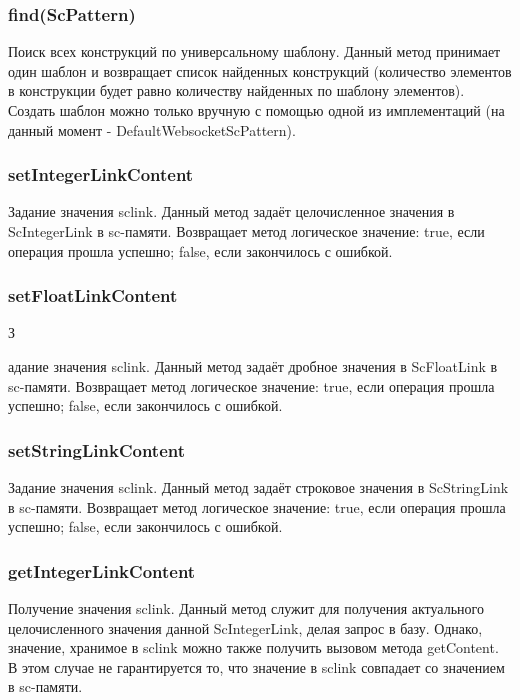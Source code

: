 \subsubsection{find(ScPattern)} 

Поиск всех конструкций по универсальному шаблону. Данный метод принимает один шаблон и возвращает список найденных конструкций (количество элементов в конструкции будет равно количеству найденных по шаблону элементов). Создать шаблон можно только вручную с помощью одной из имплементаций (на данный момент - DefaultWebsocketScPattern).

\subsubsection {setIntegerLinkContent} 

Задание значения sclink. Данный метод задаёт целочисленное значения в ScIntegerLink в sc-памяти. Возвращает метод логическое значение: true, если операция прошла успешно; false, если закончилось с ошибкой. 

\subsubsection {setFloatLinkContent} З

адание значения sclink. Данный метод задаёт дробное значения в ScFloatLink в sc-памяти. Возвращает метод логическое значение: true, если операция прошла успешно; false, если закончилось с ошибкой. 

\subsubsection {setStringLinkContent} 

Задание значения sclink. Данный метод задаёт строковое значения в ScStringLink в sc-памяти. Возвращает метод логическое значение: true, если операция прошла успешно; false, если закончилось с ошибкой. 

\subsubsection {getIntegerLinkContent} 

Получение значения sclink. Данный метод служит для получения актуального целочисленного значения данной ScIntegerLink, делая запрос в базу. Однако, значение, хранимое в sclink можно также получить вызовом метода getContent. В этом случае не гарантируется то, что значение в sclink совпадает со значением в sc-памяти.

